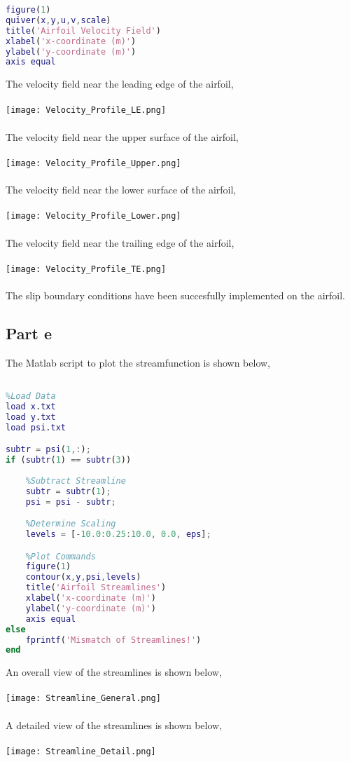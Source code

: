 \documentclass[a4paper, 12pt]{report}
\def\size{0.90}
\def\sizel{1.03}
\begin{document}
\begin{center}
\begin{lstlisting}[language = Matlab]
%Plot Commands
figure(1)
quiver(x,y,u,v,scale)
title('Airfoil Velocity Field')
xlabel('x-coordinate (m)')
ylabel('y-coordinate (m)')
axis equal
\end{lstlisting}
$$$$
The velocity field near the leading edge of the airfoil,
\\~\\\texttt{[image: Velocity\_Profile\_LE.png]}
\\~\\The velocity field near the upper surface of the airfoil,
\\~\\\texttt{[image: Velocity\_Profile\_Upper.png]}
\\~\\The velocity field near the lower surface of the airfoil,
\\~\\\texttt{[image: Velocity\_Profile\_Lower.png]}
\\~\\The velocity field near the trailing edge of the airfoil,
\\~\\\texttt{[image: Velocity\_Profile\_TE.png]}
\\~\\The slip boundary conditions have been succesfully implemented on the airfoil.
\subsection{Part e}
The Matlab script to plot the streamfunction is shown below,
\begin{lstlisting}[language = Matlab]
%Author: Hans C. Suganda

%Load Data
load x.txt
load y.txt
load psi.txt

subtr = psi(1,:);
if (subtr(1) == subtr(3))
    
    %Subtract Streamline
    subtr = subtr(1);
    psi = psi - subtr;

    %Determine Scaling
    levels = [-10.0:0.25:10.0, 0.0, eps];

    %Plot Commands
    figure(1)
    contour(x,y,psi,levels)
    title('Airfoil Streamlines')
    xlabel('x-coordinate (m)')
    ylabel('y-coordinate (m)')
    axis equal
else
    fprintf('Mismatch of Streamlines!')
end
\end{lstlisting}
$$$$
An overall view of the streamlines is shown below,
\\~\\\texttt{[image: Streamline\_General.png]}
\\~\\A detailed view of the streamlines is shown below,
\\~\\\texttt{[image: Streamline\_Detail.png]}

\end{center}
\end{document}
